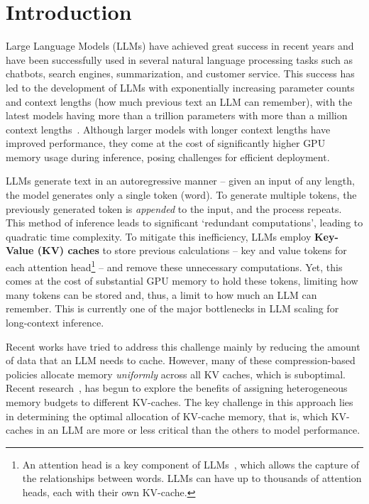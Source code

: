 
\section{Introduction}\label{sec:intro}


Large Language Models (LLMs) have achieved great success in recent years and have been successfully used in several natural language processing tasks such as chatbots, search engines, summarization, and customer service. This success has led to the development of LLMs with exponentially increasing parameter counts and context lengths (how much previous text an LLM can remember), with the latest models having more than a trillion parameters with more than a million context lengths~\cite{geminiteam2024, ren2023trillionparameter}. Although larger models with longer context lengths have improved performance, they come at the cost of significantly higher GPU memory usage during inference, posing challenges for efficient deployment.

LLMs generate text in an autoregressive manner -- given an input of any length, the model generates only a single token (word). To generate multiple tokens, the previously generated token is {\em appended} to the input, and the process repeats. This method of inference leads to significant `redundant computations', leading to quadratic time complexity. To mitigate this inefficiency, LLMs employ {\bf Key-Value (KV) caches} to store previous calculations -- key and value tokens for each attention head\footnote{An attention head is a key component of LLMs~\cite{vaswani2023attentionneed}, which allows the capture of the relationships between words. LLMs can have up to thousands of attention heads, each with their own KV-cache.} -- and remove these unnecessary computations. Yet, this comes at the cost of substantial GPU memory to hold these tokens, limiting how many tokens can be stored and, thus, a limit to how much an LLM can remember. This is currently one of the major bottlenecks in LLM scaling for long-context inference. 

Recent works have tried to address this challenge mainly by reducing the amount of data that an LLM needs to cache. However, many of these compression-based policies allocate memory {\em uniformly} across all KV caches, which is suboptimal. Recent research~\cite{squeezeattention, pyramidinfer, adakv}, has begun to explore the benefits of assigning heterogeneous memory budgets to different KV-caches. The key challenge in this approach lies in determining the optimal allocation of KV-cache memory, that is, which KV-caches in an LLM are more or less critical than the others to model performance.

